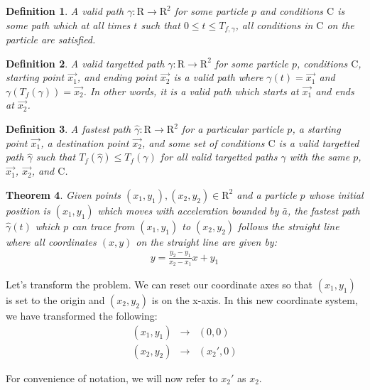 \documentclass[12pt]{amsart}   %
\newtheorem{theorem}{Theorem}[section]
\newtheorem{definition}[theorem]{Definition}
\begin{document}
\begin{definition}
  A valid path $\gamma: \mathrm{R} \to \mathrm{R}^2$ for some particle $p$ and conditions $\mathrm{C}$ is some path which at all times $t$ such that $0 \leq t \leq T_{f, \gamma}$, all conditions in $\mathrm{C}$ on the particle are satisfied.
\end{definition}

\begin{definition}
  A valid targetted path $\gamma: \mathrm{R} \to \mathrm{R}^2$ for some particle $p$, conditions $\mathrm{C}$, starting point $\vec{x_1}$, and ending point $\vec{x_2}$ is a valid path where $\gamma(t) = \vec{x_1}$ and $\gamma(T_f(\gamma)) = \vec{x_2}$. In other words, it is a valid path which starts at $\vec{x_1}$ and ends at $\vec{x_2}$.
\end{definition}

\begin{definition}
  A fastest path $\hat{\gamma}: \mathrm{R} \to \mathrm{R}^2$ for a particular particle $p$, a starting point $\vec{x_1}$, a destination point $\vec{x_2}$, and some set of conditions $\mathrm{C}$ is a valid targetted path $\hat{\gamma}$ such that $T_f(\hat{\gamma}) \leq T_f(\gamma)$ for all valid targetted paths $\gamma$ with the same $p$, $\vec{x_1}$, $\vec{x_2}$, and $\mathrm{C}$.
\end{definition}

  \begin{theorem}
  Given points $(x_1, y_1), (x_2, y_2) \in \mathrm{R}^2$ and a particle $p$ whose initial position is $(x_1, y_1)$ which moves with acceleration bounded by $\bar{a}$, the fastest path $\hat{\gamma}(t)$ which $p$ can trace from $(x_1, y_1)$ to $(x_2, y_2)$ follows the straight line where all coordinates $(x,y)$ on the straight line are given by:
  \begin{eqnarray}
    y = \frac{y_2 - y_1}{x_2 - x_1} x + y_1
  \end{eqnarray}
\end{theorem}
\proof Let's transform the problem. We can reset our coordinate axes so that $(x_1, y_1)$ is set to the origin and $(x_2, y_2)$ is on the x-axis. In this new coordinate system, we have transformed the following:
\begin{eqnarray}
  (x_1, y_1) &\to& (0,0) \\
  (x_2, y_2) &\to& (x_2', 0)
\end{eqnarray}

For convenience of notation, we will now refer to $x_2'$ as $x_2$.
\end{document}
